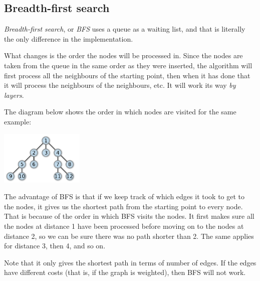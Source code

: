 \subsection{Breadth-first search}

\emph{Breadth-first search}, or \emph{BFS} uses a queue as a waiting list,
and that is literally the only difference in the implementation.

What changes is the order the nodes will be processed in.
Since the nodes are taken from the queue
in the same order as they were inserted,
the algorithm will first process all the neighbours of the starting point,
then when it has done that it will process the neighbours of the neighbours,
etc. It will work its way \emph{by layers}.

The diagram below shows the order in which nodes are visited for
the same example:
\begin{center}
    \includegraphics[width=0.3\textwidth]{img/bfs}
\end{center}

The advantage of BFS is that if we keep track of which edges it took
to get to the nodes, it gives us the shortest path from the starting point
to every node.
That is because of the order in which BFS visits the nodes.
It first makes sure all the nodes at distance 1 have been processed before
moving on to the nodes at distance 2, so we can be sure there was no path
shorter than 2. The same applies for distance 3, then 4, and so on.

Note that it only gives the shortest path in terms of number of edges.
If the edges have different costs (that is, if the graph is weighted),
then BFS will not work.
